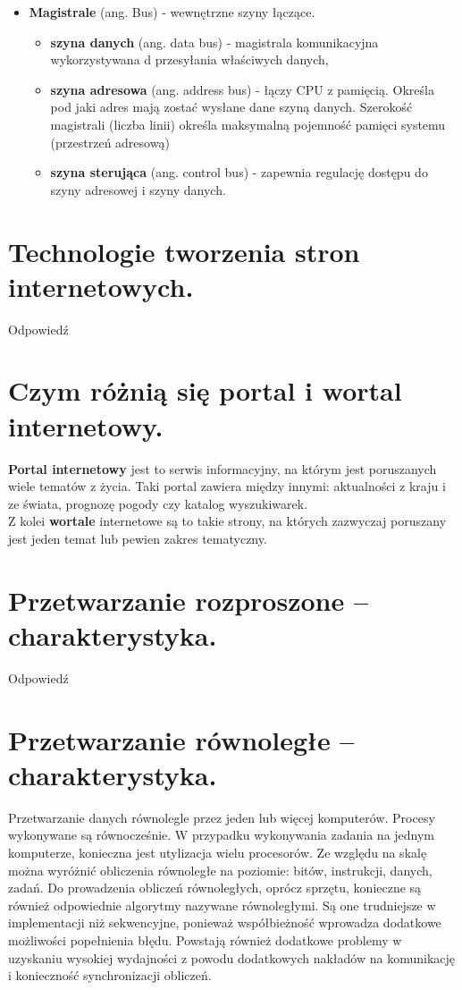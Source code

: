 \documentclass[12pt,a4paper]{article}
\begin{document}
\begin{itemize}
		\item \textbf{Magistrale} (ang. Bus) - wewnętrzne szyny łączące.
		\begin{itemize}
			\item \textbf{szyna danych} (ang. data bus) - magistrala komunikacyjna wykorzystywana d przesyłania właściwych danych,
			\item \textbf{szyna adresowa} (ang. address bus) - łączy CPU z pamięcią. Określa pod jaki adres mają zostać wysłane dane szyną danych. Szerokość magistrali (liczba linii) określa maksymalną pojemność pamięci systemu (przestrzeń adresową)
			\item \textbf{szyna sterująca} (ang. control bus) - zapewnia regulację dostępu do szyny adresowej i szyny danych.
		\end{itemize}
	\end{itemize}

	\section{Technologie tworzenia stron internetowych.}
	Odpowiedź

	\section{Czym różnią się portal i wortal internetowy.}
	\textbf{Portal internetowy} jest to serwis informacyjny, na którym jest poruszanych wiele tematów z życia. Taki portal zawiera między innymi: aktualności z kraju i ze świata, prognozę pogody czy katalog wyszukiwarek.\\
	Z kolei \textbf{wortale} internetowe są to takie strony, na których zazwyczaj poruszany jest jeden temat lub pewien zakres tematyczny.

	\section{Przetwarzanie rozproszone – charakterystyka.}
	Odpowiedź

	\section{Przetwarzanie równoległe – charakterystyka.}
	Przetwarzanie danych równolegle przez jeden lub więcej komputerów. Procesy wykonywane są równocześnie. W przypadku wykonywania zadania na jednym komputerze, konieczna jest utylizacja wielu procesorów. Ze względu na skalę można wyróżnić obliczenia równoległe na poziomie: bitów, instrukcji, danych, zadań. Do prowadzenia obliczeń równoległych, oprócz sprzętu, konieczne są również odpowiednie algorytmy nazywane równoległymi. Są one trudniejsze w implementacji niż sekwencyjne, ponieważ współbieżność wprowadza dodatkowe możliwości popełnienia błędu. Powstają również dodatkowe problemy w uzyskaniu wysokiej wydajności z powodu dodatkowych nakładów na komunikację i konieczność synchronizacji obliczeń.
\end{document}
